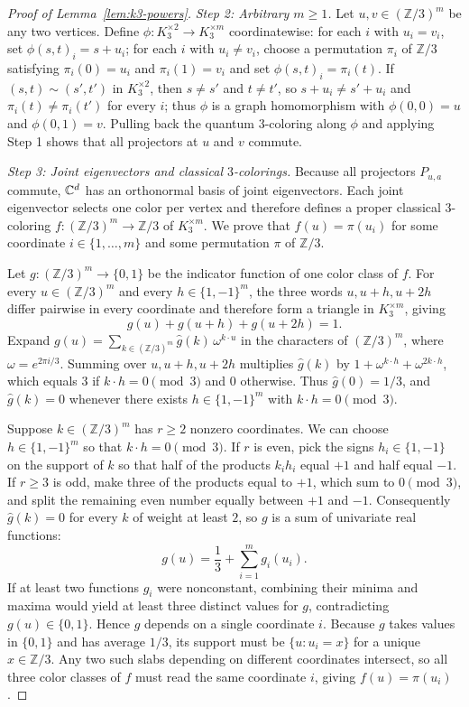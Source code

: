 \begin{proof}[Proof of Lemma~\ref{lem:k3-powers}]
\emph{Step 2: Arbitrary $m\ge1$.} Let $u,v\in(\mathbb Z/3)^m$ be any two vertices. Define $\phi:K_3^{\times2}\to K_3^{\times m}$ coordinatewise: for each $i$ with $u_i=v_i$, set $\phi(s,t)_i=s+u_i$; for each $i$ with $u_i\ne v_i$, choose a permutation $\pi_i$ of $\mathbb Z/3$ satisfying $\pi_i(0)=u_i$ and $\pi_i(1)=v_i$ and set $\phi(s,t)_i=\pi_i(t)$. If $(s,t)\sim(s',t')$ in $K_3^{\times2}$, then $s\ne s'$ and $t\ne t'$, so $s+u_i\ne s'+u_i$ and $\pi_i(t)\ne\pi_i(t')$ for every $i$; thus $\phi$ is a graph homomorphism with $\phi(0,0)=u$ and $\phi(0,1)=v$. Pulling back the quantum $3$-coloring along $\phi$ and applying Step 1 shows that all projectors at $u$ and $v$ commute.

\emph{Step 3: Joint eigenvectors and classical $3$-colorings.} Because all projectors $P_{u,a}$ commute, $\mathbb C^d$ has an orthonormal basis of joint eigenvectors. Each joint eigenvector selects one color per vertex and therefore defines a proper classical $3$-coloring $f:(\mathbb Z/3)^m\to\mathbb Z/3$ of $K_3^{\times m}$. We prove that $f(u)=\pi(u_i)$ for some coordinate $i\in\{1,\ldots,m\}$ and some permutation $\pi$ of $\mathbb Z/3$.

Let $g:(\mathbb Z/3)^m\to\{0,1\}$ be the indicator function of one color class of $f$. For every $u\in(\mathbb Z/3)^m$ and every $h\in\{1,-1\}^m$, the three words $u,u+h,u+2h$ differ pairwise in every coordinate and therefore form a triangle in $K_3^{\times m}$, giving
\[
 g(u)+g(u+h)+g(u+2h)=1.
\]
Expand $g(u)=\sum_{k\in(\mathbb Z/3)^m}\hat g(k)\,\omega^{k\cdot u}$ in the characters of $(\mathbb Z/3)^m$, where $\omega=e^{2\pi i/3}$. Summing over $u,u+h,u+2h$ multiplies $\hat g(k)$ by $1+\omega^{k\cdot h}+\omega^{2k\cdot h}$, which equals $3$ if $k\cdot h=0\pmod3$ and $0$ otherwise. Thus $\hat g(0)=1/3$, and $\hat g(k)=0$ whenever there exists $h\in\{1,-1\}^m$ with $k\cdot h=0\pmod3$.

Suppose $k\in(\mathbb Z/3)^m$ has $r\ge2$ nonzero coordinates. We can choose $h\in\{1,-1\}^m$ so that $k\cdot h=0\pmod3$. If $r$ is even, pick the signs $h_i\in\{1,-1\}$ on the support of $k$ so that half of the products $k_ih_i$ equal $+1$ and half equal $-1$. If $r\ge3$ is odd, make three of the products equal to $+1$, which sum to $0\pmod3$, and split the remaining even number equally between $+1$ and $-1$. Consequently $\hat g(k)=0$ for every $k$ of weight at least $2$, so $g$ is a sum of univariate real functions:
\[
 g(u)=\frac13+\sum_{i=1}^m g_i(u_i).
\]
If at least two functions $g_i$ were nonconstant, combining their minima and maxima would yield at least three distinct values for $g$, contradicting $g(u)\in\{0,1\}$. Hence $g$ depends on a single coordinate $i$. Because $g$ takes values in $\{0,1\}$ and has average $1/3$, its support must be $\{u:u_i=x\}$ for a unique $x\in\mathbb Z/3$. Any two such slabs depending on different coordinates intersect, so all three color classes of $f$ must read the same coordinate $i$, giving $f(u)=\pi(u_i)$.


\end{proof}
